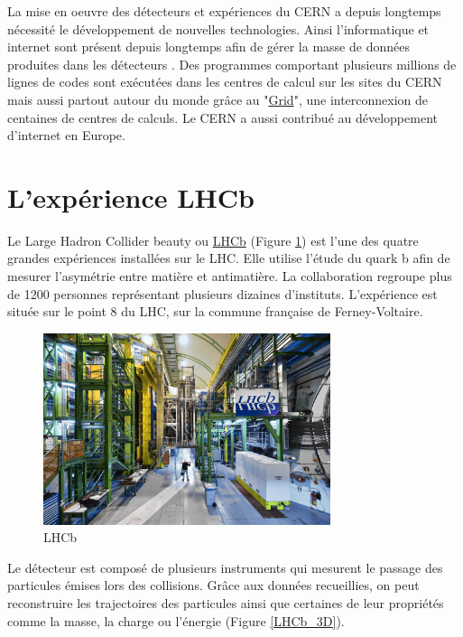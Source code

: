 \documentclass[a4paper,11pt]{report}
\begin{document}
La mise en oeuvre des détecteurs et expériences du CERN a depuis longtemps nécessité le développement de nouvelles technologies.
Ainsi l'informatique et internet sont présent depuis longtemps afin de gérer la masse de données produites dans les détecteurs \cite{Saikumar:2022mgb}.
Des programmes comportant plusieurs millions de lignes de codes sont exécutées dans les centres de calcul sur les sites du CERN
mais aussi partout autour du monde grâce au "\href{https://wlcg-public.web.cern.ch/}{Grid}", une interconnexion de centaines de centres de calculs.
Le CERN a aussi contribué au développement d'internet en Europe.

\section{L'expérience LHCb}
Le Large Hadron Collider beauty ou \href{https://lhcb.web.cern.ch/}{LHCb} (Figure \ref{LHCb}) est l'une des quatre grandes expériences installées sur le LHC.
Elle utilise l'étude du quark b afin de mesurer l'asymétrie entre matière et antimatière.
La collaboration regroupe plus de 1200 personnes représentant plusieurs dizaines d'instituts.
L'expérience est située sur le point 8 du LHC, sur la commune française de Ferney-Voltaire.

\begin{figure}[!htb]
    \includegraphics[width=0.75\textwidth, center]{LHCb.jpg}
    \caption{LHCb}
    \label{LHCb}
\end{figure}

Le détecteur est composé de plusieurs instruments qui mesurent le passage des particules émises lors des collisions.
Grâce aux données recueillies, on peut reconstruire les trajectoires des particules ainsi que certaines de leur propriétés comme la masse, la charge ou l'énergie (Figure \ref{LHCb_3D}).
\end{document}
